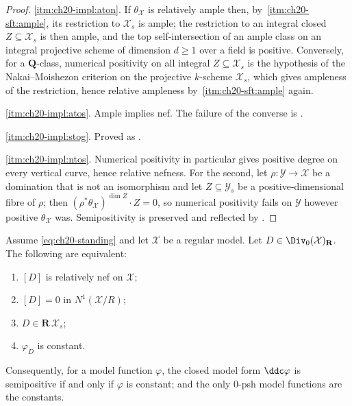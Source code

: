 \begin{proof}
\cref{itm:ch20-impl:aton}.  If $\theta_{\mathcal X}$ is relatively ample
then, by
\,\cref{itm:ch20-sft:ample}, its
restriction to $\mathcal X_s$ is ample; the restriction to an integral
closed $Z\subseteq\mathcal X_s$ is then ample, and the top
self-intersection of an ample class on an integral projective scheme of
dimension $d\geq1$ over a field is positive.  Conversely, for a
$\mathbf Q$-class, numerical positivity on all integral
$Z\subseteq\mathcal X_s$ is the hypothesis of the Nakai--Moishezon
criterion on the projective $k$-scheme $\mathcal X_s$, which gives
ampleness of the restriction, hence relative ampleness by
\,\cref{itm:ch20-sft:ample} again.

\cref{itm:ch20-impl:atos}.  Ample implies nef.  The failure of the converse
is .

\cref{itm:ch20-impl:stog}.  Proved as
.

\cref{itm:ch20-impl:ntos}.  Numerical positivity in particular gives
positive degree on every vertical curve, hence relative nefness.
For the second, let $\rho:\mathcal Y\to\mathcal X$ be
a domination that is not an isomorphism and let $Z\subseteq\mathcal Y_s$
be a positive-dimensional fibre of $\rho$; then
$(\rho^*\theta_{\mathcal X})^{\dim Z}\cdot Z=0$, so numerical positivity
fails on $\mathcal Y$ however positive $\theta_{\mathcal X}$ was.
Semipositivity is preserved and reflected by
.
\end{proof}

\begin{theorem}
\label{thm:ch20-vertical-nef-rigidity}
Assume \eqref{eq:ch20-standing} and let $\mathcal X$ be a regular model.
Let $D\in\Div_0(\mathcal X)_{\mathbf R}$.  The following are equivalent:
\begin{enumerate}
\item\label{itm:ch20-rig:nef} $[D]$ is relatively nef on $\mathcal X$;
\item\label{itm:ch20-rig:zero} $[D]=0$ in $N^1(\mathcal X/R)$;
\item\label{itm:ch20-rig:prop} $D\in\mathbf R\,\mathcal X_s$;
\item\label{itm:ch20-rig:const} $\varphi_D$ is constant.
\end{enumerate}
Consequently, for a model function $\varphi$, the closed model form
$\ddc\varphi$ is semipositive if and only if $\varphi$ is constant; and
the only $0$-psh model functions are the constants.
\end{theorem}

